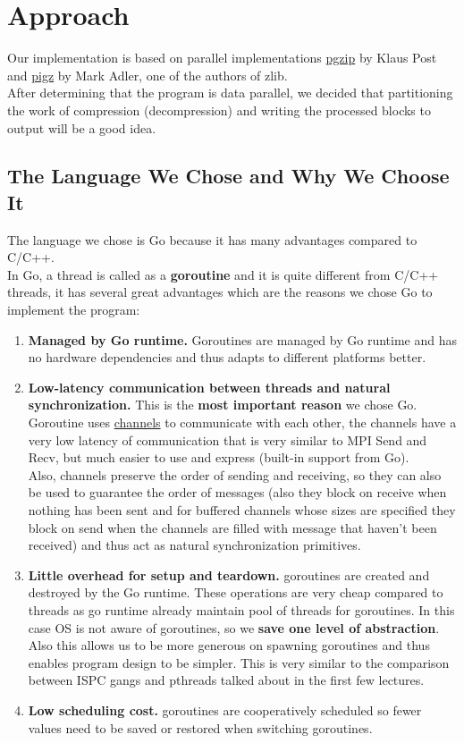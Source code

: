 \documentclass[12pt]{article}
\begin{document}
\section{Approach}
    Our implementation is based on parallel implementations \href{https://github.com/klauspost/pgzip}{pgzip} by Klaus Post and \href{https://zlib.net/pigz/}{pigz} by Mark Adler, one of the authors of zlib.\\
    After determining that the program is data parallel, we decided that partitioning the work of compression (decompression) and writing the processed blocks to output will be a good idea.
    \subsection{The Language We Chose and Why We Choose It}
    The language we chose is Go because it has many advantages compared to C/C++.\\
    In Go, a thread is called as a \textbf{goroutine} and it is quite different from C/C++ threads, it has several great advantages which are the reasons we chose Go to implement the program:
    \begin{enumerate}
    \item \textbf{Managed by Go runtime.} Goroutines are managed by Go runtime and has no hardware dependencies and thus adapts to different platforms better.
    \item \textbf{Low-latency communication between threads and natural synchronization.} This is the \textbf{most important reason} we chose Go. Goroutine uses \href{https://tour.golang.org/concurrency/2}{channels} to communicate with each other, the channels have a very low latency of communication that is very similar to MPI Send and Recv, but much easier to use and express (built-in support from Go).\\
    Also, channels preserve the order of sending and receiving, so they can also be used to guarantee the order of messages (also they block on receive when nothing has been sent and for buffered channels whose sizes are specified they block on send when the channels are filled with message that haven't been received) and thus act as natural synchronization primitives.
    \item \textbf{Little overhead for setup and teardown.} goroutines are created and destroyed by the Go runtime. These operations are very cheap compared to threads as go runtime already maintain pool of threads for goroutines. In this case OS is not aware of goroutines, so we \textbf{save one level of abstraction}.\\
    Also this allows us to be more generous on spawning goroutines and thus enables program design to be simpler. This is very similar to the comparison between ISPC gangs and pthreads talked about in the first few lectures.
    \item \textbf{Low scheduling cost.} goroutines are cooperatively scheduled so fewer values need to be saved or restored when switching goroutines.
    \end{enumerate}
\end{document}
